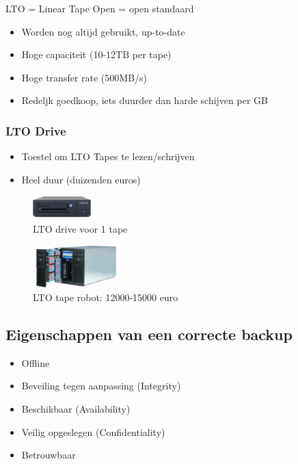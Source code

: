 \documentclass{article}
\begin{document}
LTO = Linear Tape Open = open standaard

\begin{itemize}
    \item Worden nog altijd gebruikt, up-to-date
    \item Hoge capaciteit (10-12TB per tape)
    \item Hoge transfer rate (500MB/s)
    \item Redeljk goedkoop, iets duurder dan harde schijven per GB
\end{itemize}

\subsubsection{LTO Drive}


\begin{itemize}
    \item Toestel om LTO Tapes te lezen/schrijven
    \item Heel duur (duizenden euros)
\end{itemize}

\begin{figure}[H]
    \centering
    \includegraphics[width=0.2\textwidth]{lto-drive-single.png}
    \caption{LTO drive voor 1 tape}
\end{figure}

\begin{figure}[H]
    \centering
    \includegraphics[width=0.3\textwidth]{lto-drive-multi.png}
    \caption{LTO tape robot: 12000-15000 euro}
\end{figure}


\subsection{Eigenschappen van een correcte backup}

\begin{itemize}
    \item Offline
    \item Beveiling tegen aanpassing (Integrity)
    \item Beschikbaar (Availability)
    \item Veilig opgeslegen (Confidentiality)
    \item Betrouwbaar 
\end{itemize}
\end{document}
